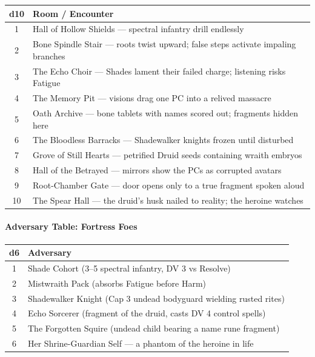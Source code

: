 \documentclass[11pt]{article}
\begin{document}
\begin{center}
\begin{longtable}{cl}
\toprule
\textbf{d10} & \textbf{Room / Encounter} \\
\midrule
1 & Hall of Hollow Shields --- spectral infantry drill endlessly \\
2 & Bone Spindle Stair --- roots twist upward; false steps activate impaling branches \\
3 & The Echo Choir --- Shades lament their failed charge; listening risks Fatigue \\
4 & The Memory Pit --- visions drag one PC into a relived massacre \\
5 & Oath Archive --- bone tablets with names scored out; fragments hidden here \\
6 & The Bloodless Barracks --- Shadewalker knights frozen until disturbed \\
7 & Grove of Still Hearts --- petrified Druid seeds containing wraith embryos \\
8 & Hall of the Betrayed --- mirrors show the PCs as corrupted avatars \\
9 & Root-Chamber Gate --- door opens only to a true fragment spoken aloud \\
10 & The Spear Hall --- the druid's husk nailed to reality; the heroine watches \\
\bottomrule
\end{longtable}
\end{center}

\bigskip

\paragraph{Adversary Table: Fortress Foes}

\begin{center}
\begin{longtable}{cl}
\toprule
\textbf{d6} & \textbf{Adversary} \\
\midrule
1 & Shade Cohort (3--5 spectral infantry, DV 3 vs Resolve) \\
2 & Mistwraith Pack (absorbs Fatigue before Harm) \\
3 & Shadewalker Knight (Cap 3 undead bodyguard wielding rusted rites) \\
4 & Echo Sorcerer (fragment of the druid, casts DV 4 control spells) \\
5 & The Forgotten Squire (undead child bearing a name rune fragment) \\
6 & Her Shrine-Guardian Self --- a phantom of the heroine in life \\
\bottomrule
\end{longtable}
\end{center}
\end{document}
